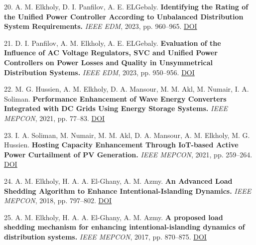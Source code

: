 \documentclass[10pt,a4paper]{article}
\begin{document}
20. A. M. Elkholy, D. I. Panfilov, A. E. ELGebaly. \textbf{Identifying the Rating of the Unified Power Controller According to Unbalanced Distribution System Requirements.} \textit{IEEE EDM}, 2023, pp. 960–965. \href{https://doi.org/10.1109/edm58354.2023.10225130}{DOI}\par
21. D. I. Panfilov, A. M. Elkholy, A. E. ELGebaly. \textbf{Evaluation of the Influence of AC Voltage Regulators, SVC and Unified Power Controllers on Power Losses and Quality in Unsymmetrical Distribution Systems.} \textit{IEEE EDM}, 2023, pp. 950–956. \href{https://doi.org/10.1109/edm58354.2023.10225221}{DOI}\par
22. M. G. Hussien, A. M. Elkholy, D. A. Mansour, M. M. Akl, M. Numair, I. A. Soliman. \textbf{Performance Enhancement of Wave Energy Converters Integrated with DC Grids Using Energy Storage Systems.} \textit{IEEE MEPCON}, 2021, pp. 77–83. \href{https://doi.org/10.1109/mepcon50283.2021.9686294}{DOI}\par
23. I. A. Soliman, M. Numair, M. M. Akl, D. A. Mansour, A. M. Elkholy, M. G. Hussien. \textbf{Hosting Capacity Enhancement Through IoT-based Active Power Curtailment of PV Generation.} \textit{IEEE MEPCON}, 2021, pp. 259–264. \href{https://doi.org/10.1109/mepcon50283.2021.9686240}{DOI}\par
24. A. M. Elkholy, H. A. A. El-Ghany, A. M. Azmy. \textbf{An Advanced Load Shedding Algorithm to Enhance Intentional-Islanding Dynamics.} \textit{IEEE MEPCON}, 2018, pp. 797–802. \href{https://doi.org/10.1109/mepcon.2018.8635139}{DOI}\par
25. A. M. Elkholy, H. A. A. El-Ghany, A. M. Azmy. \textbf{A proposed load shedding mechanism for enhancing intentional-islanding dynamics of distribution systems.} \textit{IEEE MEPCON}, 2017, pp. 870–875. \href{https://doi.org/10.1109/mepcon.2017.8301282}{DOI}\par
\end{document}
